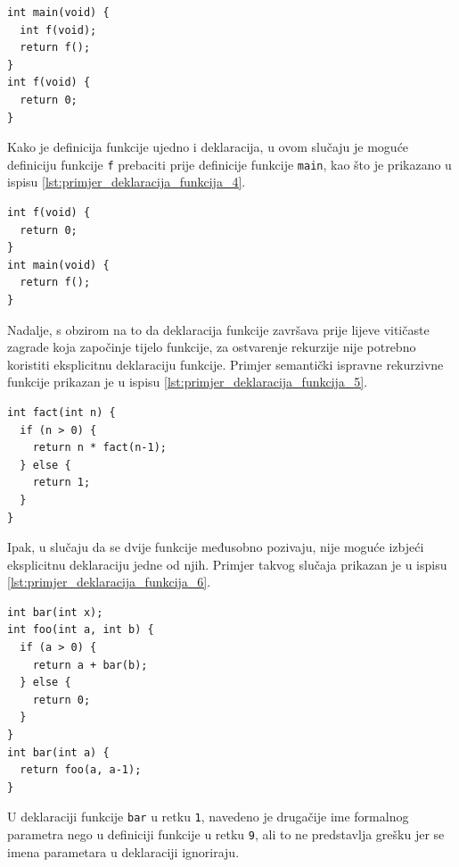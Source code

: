 \documentclass[times, 12pt, utf8]{book}
\begin{document}
\begin{lstlisting}[caption={Deklaracija funkcije \texttt{f} neposredno prije poziva u tijelu funkcije \texttt{main}.},label=lst:primjer_deklaracija_funkcija_3]
int main(void) {
  int f(void);
  return f();
}
int f(void) {
  return 0;
}
\end{lstlisting}

Kako je definicija funkcije ujedno i deklaracija, u ovom slučaju je moguće definiciju funkcije \verb|f| prebaciti prije definicije funkcije \verb|main|, kao što je prikazano u ispisu \ref{lst:primjer_deklaracija_funkcija_4}.

\begin{lstlisting}[caption={Definicija funkcije \texttt{f} je ujedno i njena deklaracija.},label=lst:primjer_deklaracija_funkcija_4]
int f(void) {
  return 0;
}
int main(void) {
  return f();
}
\end{lstlisting}

Nadalje, s obzirom na to da deklaracija funkcije završava prije lijeve vitičaste zagrade koja započinje tijelo funkcije, za ostvarenje rekurzije nije potrebno koristiti eksplicitnu deklaraciju funkcije.
Primjer semantički ispravne rekurzivne funkcije prikazan je u ispisu \ref{lst:primjer_deklaracija_funkcija_5}.

\begin{lstlisting}[caption={Rekurzivne funkcije ne treba eksplicitno deklarirati prije definicije.},label=lst:primjer_deklaracija_funkcija_5]
int fact(int n) {
  if (n > 0) {
    return n * fact(n-1);
  } else {
    return 1;
  }
}
\end{lstlisting}

Ipak, u slučaju da se dvije funkcije međusobno pozivaju, nije moguće izbjeći eksplicitnu deklaraciju jedne od njih.
Primjer takvog slučaja prikazan je u ispisu \ref{lst:primjer_deklaracija_funkcija_6}.

\begin{lstlisting}[caption={Nužna deklaracija funkcije \texttt{bar} prije definicije funkcije \texttt{foo}.},label=lst:primjer_deklaracija_funkcija_6]
int bar(int x);
int foo(int a, int b) {
  if (a > 0) {
    return a + bar(b);
  } else {
    return 0;
  }
}
int bar(int a) {
  return foo(a, a-1);
}
\end{lstlisting}

U deklaraciji funkcije \verb|bar| u retku \verb|1|, navedeno je drugačije ime formalnog parametra nego u definiciji funkcije u retku \verb|9|, ali to ne predstavlja grešku jer se imena parametara u deklaraciji ignoriraju.
\end{document}
